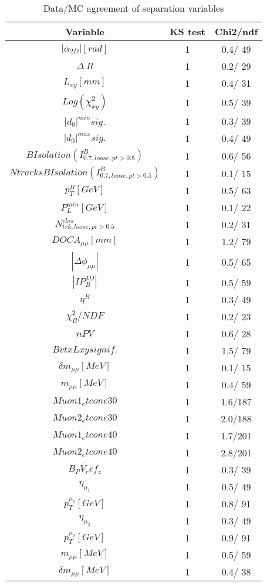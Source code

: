 \documentclass{article}
\begin{document}
\begin{table}[htbp]
\caption{\label{tab:sepVars}Data/MC agreement of separation variables}
\begin{center}
\begin{tabular}{c|c|c}
Variable & KS test & Chi2/ndf \\
\hline
$|\alpha_{2D}| [rad]$ & 1 &   0.4/ 49\\
\hline
$\Delta~R$ & 1 &   0.2/ 29\\
\hline
$L_{xy} [mm]$ & 1 &   0.4/ 31\\
\hline
$Log(\chi^{2}_{xy})$ & 1 &   0.5/ 39\\
\hline
$|d_{0}|^{min} sig.$ & 1 &   0.3/ 39\\
\hline
$|d_{0}|^{max} sig.$ & 1 &   0.4/ 49\\
\hline
$B Isolation (I^{B}_{0.7, loose, pt>0.5})$ & 1 &   0.6/ 56\\
\hline
$Ntracks B Isolation (I^{B}_{0.7, loose, pt>0.5})$ & 1 &   0.1/ 15\\
\hline
$p_{T}^{B} [GeV]$ & 1 &   0.5/ 63\\
\hline
$P^{min}_{L} [GeV]$ & 1 &   0.1/ 22\\
\hline
$N^{clos}_{trk, loose, pt>0.5}$ & 1 &   0.2/ 31\\
\hline
$DOCA_{\mu\mu} [mm]$ & 1 &   1.2/ 79\\
\hline
$|\Delta\phi_{\mu\mu}|$ & 1 &   0.5/ 65\\
\hline
$|IP_{B}^{3D}|$ & 1 &   0.5/ 59\\
\hline
$\eta^{B}$ & 1 &   0.3/ 49\\
\hline
$\chi^{2}_{B}/NDF$ & 1 &   0.2/ 23\\
\hline
$nPV$ & 1 &   0.6/ 28\\
\hline
$BvtxLxy signif.$ & 1 &   1.5/ 79\\
\hline
$\delta m_{\mu\mu} [MeV]$ & 1 &   0.1/ 15\\
\hline
$m_{\mu\mu} [MeV]$ & 1 &   0.4/ 59\\
\hline
$Muon1_etcone30$ & 1 &   1.6/187\\
\hline
$Muon2_etcone30$ & 1 &   2.0/188\\
\hline
$Muon1_etcone40$ & 1 &   1.7/201\\
\hline
$Muon2_etcone40$ & 1 &   2.8/201\\
\hline
$B_PV_ref_z$ & 1 &   0.3/ 39\\
\hline
$\eta_{\mu_{1}}$ & 1 &   0.5/ 49\\
\hline
$p_{T}^{\mu_{1}} [GeV]$ & 1 &   0.8/ 91\\
\hline
$\eta_{\mu_{2}}$ & 1 &   0.3/ 49\\
\hline
$p_{T}^{\mu_{2}} [GeV]$ & 1 &   0.9/ 91\\
\hline
$m_{\mu\mu} [MeV]$ & 1 &   0.5/ 59\\
\hline
$\delta m_{\mu\mu} [MeV]$ & 1 &   0.4/ 38\\
\hline
\end{tabular}
\end{center}
\end{table}
\end{document}
